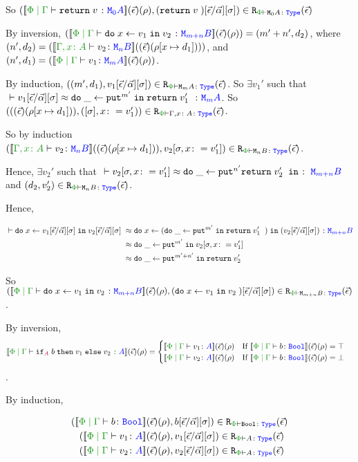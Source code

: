 \documentclass{Report}
\newcommand\erelates[2]{\texttt{R}_{\wellformedt{#1}{#2}}}
\newcommand{\av}[0]{\vec{\a}}
\newcommand\inLogRel[5]{(#1, #2)\in\erelates{#3}{#4}(#5)}
\newcommand\inLogRelE[4]{\inLogRel{#1}{#2}{#3}{#4}{\ev}}
\newcommand{\inLogRelPE}[3]{\inLogRelE{#1}{#2}{\P}{#3}}
\newcommand\fundSub[0]{\ssub{\av}{\ev}\ssi}
\newcommand\fundRho[0]{(\ev)(\rho)}
\newcommand\fundRhoExt[1]{(\ev)(\rho#1)}
\begin{document}
So $\inLogRelPE{\deno{\gpetyperelation{\return{v}}{\M{0}{A}}}\fundRho}{(\return{v})\fundSub}{\M{0}{A}}$

\case{\vbind}

By inversion, $(\deno{\gpetyperelation{\doin{x}{v_1}{v_2}}{\M{m+n}{B}}}\fundRho) = (m'+n', d_2)$, where $(n', d_2) = (\deno{\typerelation{\gax}{v_2}{\mnb}}(\fundRhoExt{[x\mapsto d_1]}))$, and $(n', d_1) = (\deno{\gpetyperelation{v_1}{\mma}}\fundRho)$.

By induction, $\inLogRelPE{(m', d_1)}{v_1\fundSub}{\mma}$. So $\exists v_1'$ such that $\zberelation{v_1\fundSub}{\doin{\_}{\put^{m'}}{\return{v_1'}}}{\mma}$. So $\inLogRelPE{(\fundRhoExt{[x\mapsto d_1]})}{(\ssi, x\setto v_1')}{\gax}$.

So by induction $\inLogRelPE{\deno{\typerelation{\gax}{v_2}{\mnb}}(\fundRhoExt{[x\mapsto d_1]})}{v_2\sub{\si, x\setto v_1'}}{\mnb}$.

Hence, $\exists v_2'$ such that $\zberelation{v_2\sub{\si, x\setto v_1'}}{\doin{\_}{\put^{n'}{\return{v_2'}}}}{\M{m + n}{B}}$ and $\inLogRelPE{d_2}{v_2'}{\mnb}$.

Hence,

\begin{align*}
    \zberelation{\doin{x}{v_1\fundSub}{v_2\fundSub}&}{\doin{x}{(\doin{\_}{\put^{m'}}{\return{v_1'}})}{(v_2\fundSub)}}{\M{m+n}{B}}\\
    &\beequiv\doin{\_}{\put^{m'}}{v_2\sub{\si, x\setto{v_1'}}}\\
    &\beequiv\doin{\_}{\put^{m'+n'}}{\return{v_2'}}
\end{align*}

So $\inLogRelPE{\deno{\gpetyperelation{\doin{x}{v_1}{v_2}}{\M{m+n}{B}}}\fundRho}{(\doin{x}{v_1}{v_2})\fundSub}{\M{m+n}{B}}$.



\case{\vif}

By inversion, $$\deno{\gpetyperelation{\pifthenelse{A}{b}{v_1}{v_2}}{A}}\fundRho = \begin{cases}
    \deno{\gpetyperelation{v_1}{A}}\fundRho \qt{If }\deno{\gpetyperelation{b}{\B}}\fundRho = \top\\
    \deno{\gpetyperelation{v_2}{A}}\fundRho \qt{If }\deno{\gpetyperelation{b}{\B}}\fundRho = \bot
\end{cases}
$$.

By induction,

\begin{align*}
    \inLogRelPE{\deno{\gpetyperelation{b}{\B}&}\fundRho}{b\fundSub}{\B}\\
    \inLogRelPE{\deno{\gpetyperelation{v_1}{A}&}\fundRho}{v_1\fundSub}{A}\\
    \inLogRelPE{\deno{\gpetyperelation{v_2}{A}&}\fundRho}{v_2\fundSub}{A}
\end{align*}
\end{document}
